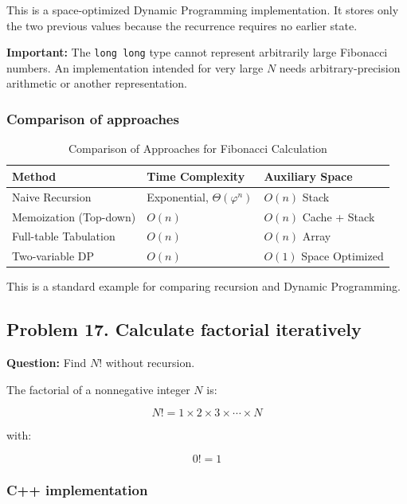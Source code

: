 This is a space-optimized Dynamic Programming implementation. It stores only the two previous values because the recurrence requires no earlier state.

\textbf{Important:} The \texttt{long long} type cannot represent arbitrarily large Fibonacci numbers. An implementation intended for very large $N$ needs arbitrary-precision arithmetic or another representation.

\subsubsection{Comparison of approaches}

\begin{table}[htbp]
\centering
\caption{Comparison of Approaches for Fibonacci Calculation}
\label{tab:fibonacci_approaches}
\begin{tabularx}{\textwidth}{p{4.5cm} X X}
\toprule
\textbf{Method} & \textbf{Time Complexity} & \textbf{Auxiliary Space} \\
\midrule
Naive Recursion & Exponential, $\Theta(\varphi^n)$ & $O(n)$ Stack \\
Memoization (Top-down) & $O(n)$ & $O(n)$ Cache + Stack \\
Full-table Tabulation & $O(n)$ & $O(n)$ Array \\
Two-variable DP & $O(n)$ & $O(1)$ Space Optimized \\
\bottomrule
\end{tabularx}
\end{table}

This is a standard example for comparing recursion and Dynamic Programming.

\subsection{Problem 17. Calculate factorial iteratively}

\textbf{Question:} Find $N!$ without recursion.

The factorial of a nonnegative integer $N$ is:


\[
\boxed{N!=1\times2\times3\times\cdots\times N}
\]


with:


\[
\boxed{0!=1}
\]


\subsubsection{C++ implementation}

